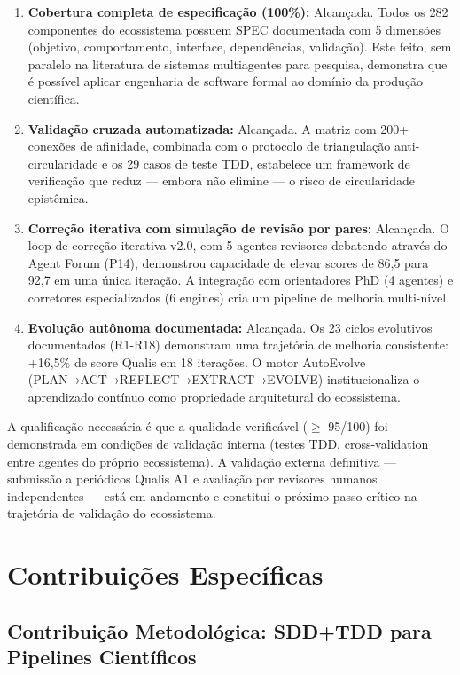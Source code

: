 \begin{enumerate}
  \item \textbf{Cobertura completa de especificação (100\%):} Alcançada. Todos os 282 componentes do ecossistema possuem SPEC documentada com 5 dimensões (objetivo, comportamento, interface, dependências, validação). Este feito, sem paralelo na literatura de sistemas multiagentes para pesquisa, demonstra que é possível aplicar engenharia de software formal ao domínio da produção científica.
  \item \textbf{Validação cruzada automatizada:} Alcançada. A matriz com 200+ conexões de afinidade, combinada com o protocolo de triangulação anti-circularidade e os 29 casos de teste TDD, estabelece um framework de verificação que reduz --- embora não elimine --- o risco de circularidade epistêmica.
  \item \textbf{Correção iterativa com simulação de revisão por pares:} Alcançada. O loop de correção iterativa v2.0, com 5 agentes-revisores debatendo através do Agent Forum (P14), demonstrou capacidade de elevar scores de 86,5 para 92,7 em uma única iteração. A integração com orientadores PhD (4 agentes) e corretores especializados (6 engines) cria um pipeline de melhoria multi-nível.
  \item \textbf{Evolução autônoma documentada:} Alcançada. Os 23 ciclos evolutivos documentados (R1-R18) demonstram uma trajetória de melhoria consistente: +16,5\% de score Qualis em 18 iterações. O motor AutoEvolve (PLAN→ACT→REFLECT→EXTRACT→EVOLVE) institucionaliza o aprendizado contínuo como propriedade arquitetural do ecossistema.
\end{enumerate}

A qualificação necessária é que a qualidade verificável ($\geq$ 95/100) foi demonstrada em condições de validação interna (testes TDD, cross-validation entre agentes do próprio ecossistema). A validação externa definitiva --- submissão a periódicos Qualis A1 e avaliação por revisores humanos independentes --- está em andamento e constitui o próximo passo crítico na trajetória de validação do ecossistema.

\section{Contribuições Específicas}

\subsection{Contribuição Metodológica: SDD+TDD para Pipelines Científicos}

